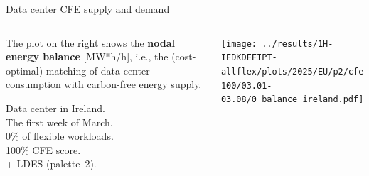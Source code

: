 \begin{frame}{Data center CFE supply and demand}
  \label{nbp2-IE-0}

  {\footnotesize
  
  \begin{columns}[T]
    \begin{column}{3.5cm}
      \vspace{0.3cm}
      The plot on the right shows the {\bf nodal energy balance} [MW*h/h], i.e., the (cost-optimal) matching of data center consumption with carbon-free energy supply.

      \vspace{0.2cm}
      Data center in Ireland. \\
      The first week of March. \\
      0\% of flexible workloads.\\
      100\% CFE score.\\
      + LDES (palette~2).

    \end{column}
  
    \begin{column}{11cm}
      \texttt{[image: ../results/1H-IEDKDEFIPT-allflex/plots/2025/EU/p2/cfe100/03.01-03.08/0\_balance\_ireland.pdf]}
    \end{column}
    \end{columns}
    } 

\end{frame}



